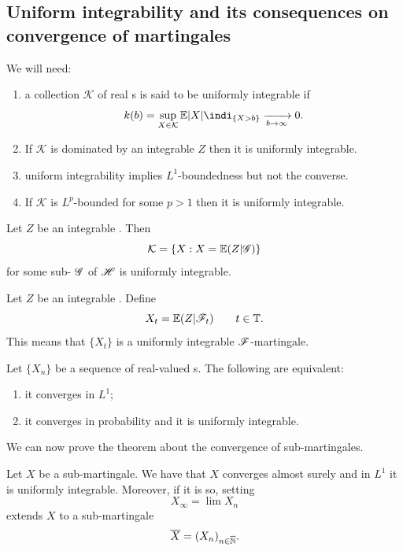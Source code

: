 \documentclass{report}
\begin{document}
\subsection{Uniform integrability and its consequences on convergence of martingales}
We will need:
\begin{enumerate}
	\item a collection $\mathcal{K}$ of real \rv s is said to be uniformly integrable if 
	\begin{equation*}
		k(b)=\sup_{X\in\mathcal{K}}\ev|X|\indi_{\{X>b\}}\xrightarrow[b\to\infty]{}0.
	\end{equation*}
	\item If $\mathcal{K}$ is dominated by an integrable \rv{} $Z$ then it is uniformly integrable.
	\item uniform integrability implies $L^{1}$-boundedness but not the converse.
	\item If $\mathcal{K}$ is $L^{p}$-bounded for some $p>1$ then it is uniformly integrable.
\end{enumerate}
\begin{lemma}
	Let $Z$ be an integrable \rv{}. Then
	\begin{equation*}
		\mathcal{K}=\left\{X:X=\mathbb{E}(Z|\mathscr{G})\right\}
	\end{equation*}
	for some sub-\sa{} $\mathscr{G}$ of $\mathscr{H}$ is uniformly integrable.
\end{lemma}
\begin{proposition}
	Let $Z$ be an integrable \rv{}. Define 
	\begin{equation*}
		X_{t}=\mathbb{E}(Z|\mathscr{F}_{t})\qquad t\in\mathbb{T}.
	\end{equation*}
	This means that $\{X_{t}\}$ is a uniformly integrable $\mathscr{F}$-martingale.
\end{proposition}
\begin{theorem}
	Let $\{X_{n}\}$ be a sequence of real-valued \rv s. The following are equivalent:
	\begin{enumerate}
		\item it converges in $L^{1}$;
		\item it converges in probability and it is uniformly integrable.
	\end{enumerate}
\end{theorem}
We can now prove the theorem about the convergence of sub-martingales.
\begin{theorem}
	Let $X$ be a sub-martingale. We have that $X$ converges almost surely and in $L^{1}$ \ifonly{} it is uniformly integrable. Moreover, if it is so, setting 
	\begin{equation*}
		X_{\infty}=\lim X_{n}
	\end{equation*}
	extends $X$ to a sub-martingale
	\begin{equation*}
		\overline{X}={(X_{n})}_{n\in\overline{\mathbb{N}}}.
	\end{equation*}
\end{theorem}
\end{document}
